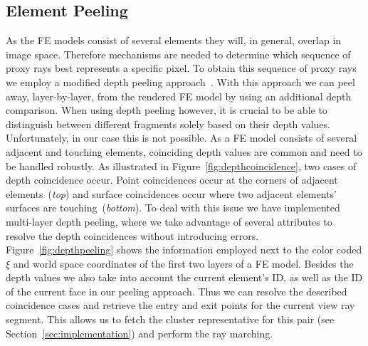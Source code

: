 \documentclass[journal]{vgtc}                %
\begin{document}
\subsection{Element Peeling}\label{subsec:peeling}
As the FE models consist of several elements they will, in general, overlap in image space. Therefore mechanisms are needed to determine which sequence of proxy rays best represents a specific pixel. To obtain this sequence of proxy rays we employ a modified depth peeling approach~\cite{mammen89DepthPeeling}. With this approach we can peel away, layer-by-layer, from the rendered FE model by using an additional depth comparison. When using depth peeling however, it is crucial to be able to distinguish between different fragments solely based on their depth values. Unfortunately, in our case this is not possible. As a FE model consists of several adjacent and touching elements, coinciding depth values are common and need to be handled robustly. As illustrated in Figure~\ref{fig:depthcoincidence}, two cases of depth coincidence occur. Point coincidences occur at the corners of adjacent elements~({\it top}) and surface coincidences occur where two adjacent elements' surfaces are touching~({\it bottom}). To deal with this issue we have implemented multi-layer depth peeling, where we take advantage of several attributes to resolve the depth coincidences without introducing errors. Figure~\ref{fig:depthpeeling} shows the information employed next to the color coded $\xi$ and world space coordinates of the first two layers of a FE model. Besides the depth values we also take into account the current element's ID, as well as the ID of the current face in our peeling approach. Thus we can resolve the described coincidence cases and retrieve the entry and exit points for the current view ray segment. This allows us to fetch the cluster representative for this pair (see Section~\ref{sec:implementation}) and perform the ray marching.
%
%
%
\end{document}
